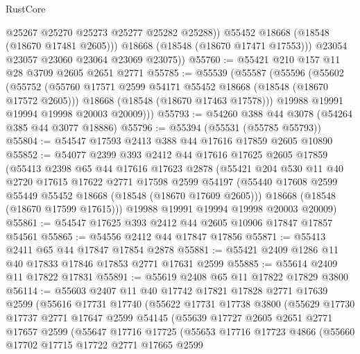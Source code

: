 \begin{lexlean}{RustCore}
\begin{coremodule}
                @25267
                @25270
                @25273
                @25277
                @25282
                @25288))
            @55452
            @18668
            (@18548 (@18670 @17481 @2605)))
          @18668
          (@18548 (@18670 @17471 @17553)))
        @23054
        @23057
        @23060
        @23064
        @23069
        @23075))
@55760 := @55421 @210 @157 @11 @28 @3709 @2605 @2651 @2771
@55785 := @55539
    (@55587
      (@55596
        (@55602
          (@55752
            (@55760 @17571 @2599 @54171 @55452 @18668 (@18548 (@18670 @17572 @2605)))
            @18668
            (@18548 (@18670 @17463 @17578)))
          @19988
          @19991
          @19994
          @19998
          @20003
          @20009)))
@55793 := @54260 @388 @44 @3078 (@54264 @385 @44 @3077 @18886)
@55796 := @55394 (@55531 (@55785 @55793))
@55804 := @54547 @17593 @2413 @388 @44 @17616 @17859 @2605 @10890
@55852 := @54077
    @2399
    @393
    @2412
    @44
    @17616
    @17625
    @2605
    @17859
    (@55413
      @2398
      @65
      @44
      @17616
      @17623
      @2878
      (@55421
        @204
        @530
        @11
        @40
        @2720
        @17615
        @17622
        @2771
        @17598
        @2599
        @54197
        (@55440 @17608 @2599 @55449 @55452 @18668 (@18548 (@18670 @17609 @2605)))
        @18668
        (@18548 (@18670 @17599 @17615)))
      @19988
      @19991
      @19994
      @19998
      @20003
      @20009)
@55861 := @54547 @17625 @393 @2412 @44 @2605 @10906 @17847 @17857 @54561
@55865 := @54556 @2412 @44 @17847 @17856
@55871 := @55413 @2411 @65 @44 @17847 @17854 @2878
@55881 := @55421 @2409 @1286 @11 @40 @17833 @17846 @17853 @2771 @17631 @2599
@55885 := @55614 @2409 @11 @17822 @17831
@55891 := @55619 @2408 @65 @11 @17822 @17829 @3800
@56114 := @55603
    @2407
    @11
    @40
    @17742
    @17821
    @17828
    @2771
    @17639
    @2599
    (@55616
      @17731
      @17740
      (@55622
        @17731
        @17738
        @3800
        (@55629
          @17730
          @17737
          @2771
          @17647
          @2599
          @54145
          (@55639
            @17727
            @2605
            @2651
            @2771
            @17657
            @2599
            (@55647
              @17716
              @17725
              (@55653
                @17716
                @17723
                @4866
                (@55660
                  @17702
                  @17715
                  @17722
                  @2771
                  @17665
                  @2599

\end{coremodule}
\end{lexlean}

